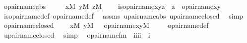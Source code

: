 \begin{isabellebody}
\isanewline
{}\isamarkupfalse%
\ opair{\isacharunderscore}{\kern0pt}name{\isacharunderscore}{\kern0pt}abs\ {\isacharcolon}{\kern0pt}\ \isanewline
\ \ \ {\isachardoublequoteopen}x{\isasymin}M{\isachardoublequoteclose}\ {\isachardoublequoteopen}y{\isasymin}M{\isachardoublequoteclose}\ {\isachardoublequoteopen}z{\isasymin}M{\isachardoublequoteclose}\ \isanewline
\ \ \ {\isachardoublequoteopen}is{\isacharunderscore}{\kern0pt}opair{\isacharunderscore}{\kern0pt}name{\isacharparenleft}{\kern0pt}x{\isacharcomma}{\kern0pt}y{\isacharcomma}{\kern0pt}z{\isacharparenright}{\kern0pt}\ {\isasymlongleftrightarrow}\ z\ {\isacharequal}{\kern0pt}\ opair{\isacharunderscore}{\kern0pt}name{\isacharparenleft}{\kern0pt}x{\isacharcomma}{\kern0pt}y{\isacharparenright}{\kern0pt}{\isachardoublequoteclose}\ \isanewline
%
\isadelimproof
\ \ %
\endisadelimproof
%
\isatagproof
{}\isamarkupfalse%
\ is{\isacharunderscore}{\kern0pt}opair{\isacharunderscore}{\kern0pt}name{\isacharunderscore}{\kern0pt}def\ opair{\isacharunderscore}{\kern0pt}name{\isacharunderscore}{\kern0pt}def\ \isamarkupfalse%
\ assms\ upair{\isacharunderscore}{\kern0pt}name{\isacharunderscore}{\kern0pt}abs\ upair{\isacharunderscore}{\kern0pt}name{\isacharunderscore}{\kern0pt}closed\ \isamarkupfalse%
\ simp%
\endisatagproof
{\isafoldproof}%
%
\isadelimproof
\isanewline
%
\endisadelimproof
\isanewline
{}\isamarkupfalse%
\ opair{\isacharunderscore}{\kern0pt}name{\isacharunderscore}{\kern0pt}closed\ {\isacharcolon}{\kern0pt}\isanewline
\ \ {\isachardoublequoteopen}{\isasymlbrakk}\ x{\isasymin}M{\isacharsemicolon}{\kern0pt}\ y{\isasymin}M\ {\isasymrbrakk}\ {\isasymLongrightarrow}\ opair{\isacharunderscore}{\kern0pt}name{\isacharparenleft}{\kern0pt}x{\isacharcomma}{\kern0pt}y{\isacharparenright}{\kern0pt}{\isasymin}M{\isachardoublequoteclose}\ \isanewline
%
\isadelimproof
\ \ %
\endisadelimproof
%
\isatagproof
{}\isamarkupfalse%
\ opair{\isacharunderscore}{\kern0pt}name{\isacharunderscore}{\kern0pt}def\ \isamarkupfalse%
\ upair{\isacharunderscore}{\kern0pt}name{\isacharunderscore}{\kern0pt}closed\ \isamarkupfalse%
\ simp%
\endisatagproof
{\isafoldproof}%
%
\isadelimproof
\isanewline
%
\endisadelimproof
\isanewline
{}\isamarkupfalse%
\isanewline
\ \ opair{\isacharunderscore}{\kern0pt}name{\isacharunderscore}{\kern0pt}fm\ {\isacharcolon}{\kern0pt}{\isacharcolon}{\kern0pt}\ {\isachardoublequoteopen}{\isacharbrackleft}{\kern0pt}i{\isacharcomma}{\kern0pt}i{\isacharcomma}{\kern0pt}i{\isacharcomma}{\kern0pt}i{\isacharbrackright}{\kern0pt}\ {\isasymRightarrow}\ i{\isachardoublequoteclose}\ \isanewline

\end{isabellebody}
